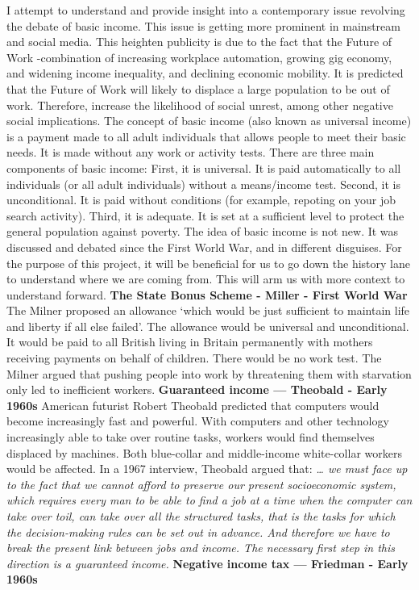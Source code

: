 \documentclass[11pt]{article}
\begin{document}
I attempt to understand and provide insight into a contemporary issue
revolving the debate of basic income. This issue is getting more
prominent in mainstream and social media. This heighten publicity is due
to the fact that the Future of Work -combination of increasing workplace
automation, growing gig economy, and widening income inequality, and
declining economic mobility. It is predicted that the Future of Work
will likely to displace a large population to be out of work. Therefore,
increase the likelihood of social unrest, among other negative social
implications. The concept of basic income (also known as universal
income) is a payment made to all adult individuals that allows people to
meet their basic needs. It is made without any work or activity tests.
There are three main components of basic income: First, it is universal.
It is paid automatically to all individuals (or all adult individuals)
without a means/income test. Second, it is unconditional. It is paid
without conditions (for example, repoting on your job search activity).
Third, it is adequate. It is set at a sufficient level to protect the
general population against poverty. The idea of basic income is not new.
It was discussed and debated since the First World War, and in different
disguises. For the purpose of this project, it will be beneficial for us
to go down the history lane to understand where we are coming from. This
will arm us with more context to understand forward. \textbf{The State
Bonus Scheme - Miller - First World War} The Milner proposed an
allowance `which would be just sufficient to maintain life and liberty
if all else failed'. The allowance would be universal and unconditional.
It would be paid to all British living in Britain permanently with
mothers receiving payments on behalf of children. There would be no work
test. The Milner argued that pushing people into work by threatening
them with starvation only led to inefficient workers. \textbf{Guaranteed
income --- Theobald - Early 1960s} American futurist Robert Theobald
predicted that computers would become increasingly fast and powerful.
With computers and other technology increasingly able to take over
routine tasks, workers would find themselves displaced by machines. Both
blue-collar and middle-income white-collar workers would be affected. In
a 1967 interview, Theobald argued that: \emph{\ldots{} we must face up
to the fact that we cannot afford to preserve our present socioeconomic
system, which requires every man to be able to find a job at a time when
the computer can take over toil, can take over all the structured tasks,
that is the tasks for which the decision-making rules can be set out in
advance. And therefore we have to break the present link between jobs
and income. The necessary first step in this direction is a guaranteed
income.} \textbf{Negative income tax --- Friedman - Early 1960s}
\end{document}
